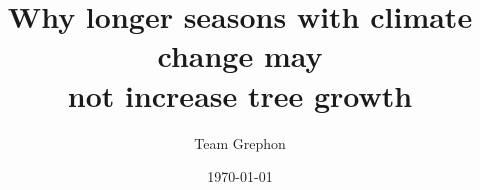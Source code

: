 \documentclass[11pt]{article}
\begin{document}
\renewcommand{\refname}{\CHead{}}


\title{Why longer seasons with climate change may \\ not increase tree growth} 
\author{Team Grephon}
\date{\today}
\maketitle
\end{document}
